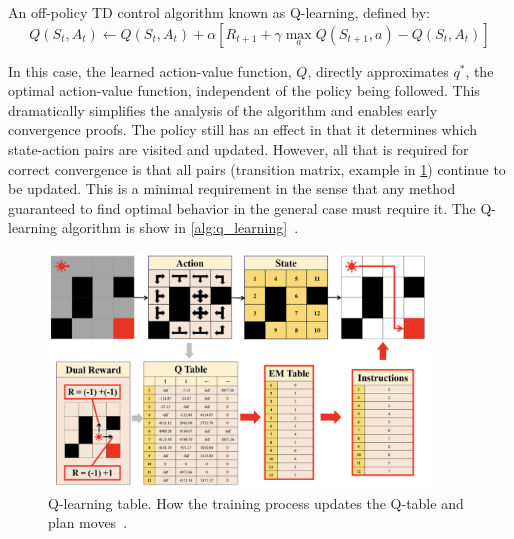 \documentclass[../xlapes02]{subfiles}
\begin{document}
    An off-policy TD control algorithm known as Q-learning, defined by:
    \begin{equation}
        \label{eq:q-learning}
        Q(S_t, A_t) \leftarrow Q(S_t, A_t) + \alpha \left[ R_{t+1} + \gamma \max_a Q(S_{t+1}, a) - Q(S_t, A_t) \right]
    \end{equation}

    In this case, the learned action-value function, \(Q\), directly approximates \(q^*\), the optimal action-value function, independent of the policy being followed. This dramatically simplifies the analysis of the algorithm and enables early convergence proofs. The policy still has an effect in that it determines which state-action pairs are visited and updated. However, all that is required for correct convergence is that all pairs (transition matrix, example in \cref{fig:q-learning}) continue to be updated. This is a minimal requirement in the sense that any method guaranteed to find optimal behavior in the general case must require it. The Q-learning algorithm is show in \cref{alg:q_learning}~\cite{rl-course-david-silver, sutton2018reinforcement}.

    \begin{figure}[h!]
        \centering
        \includegraphics[width=0.9\textwidth]{image/q-learning}
        \caption{Q-learning table. How the training process updates the Q-table and plan moves~\cite{article}.}
        \label{fig:q-learning}
    \end{figure}
\end{document}
